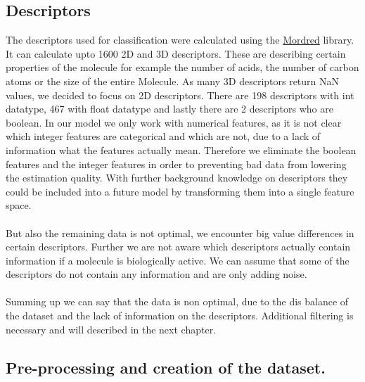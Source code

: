 \documentclass[12pt]{article}
\begin{document}

\subsection{Descriptors}\label{sec:Descriptors}
The descriptors used for classification were calculated using the  \href{https://github.com/mordred-descriptor/mordred}{Mordred} \cite{mordredpaper} library. It can calculate upto 1600 2D and 3D descriptors. These are describing certain properties of the molecule for example the number of acids, the number of carbon atoms or the size of the entire Molecule. As many 3D descriptors return NaN values, we decided to focus on 2D descriptors. There are 198 descriptors with int datatype, 467 with float datatype and lastly there are 2 descriptors who are boolean. In our model we only work with numerical features, as it is not clear which integer features are categorical and which are not, due to a lack of information what the features actually mean. Therefore we eliminate the boolean features and the integer features in order to preventing bad data from lowering the estimation quality. With further background knowledge on descriptors they could be included into a future model by transforming them into a single feature space.\\\\
%
But also the remaining data is not optimal, we encounter big value differences in certain descriptors. Further we are not aware which descriptors actually contain information if a molecule is biologically active. We can assume that some of the descriptors do not contain any information and are only adding noise.\\\\
%
Summing up we can say that the data is non optimal, due to the dis balance of the dataset and the lack of information on the descriptors. Additional filtering is necessary and will described in the next chapter.  
\subsection{Pre-processing and creation of the dataset.}
\label{sec:Dataset:pre-processing}
\end{document}
